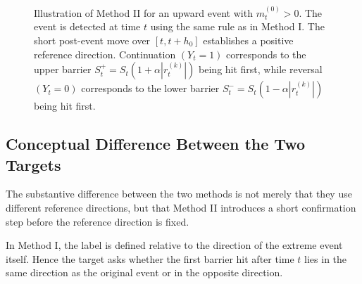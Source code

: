 \documentclass[11pt,a4paper]{article}
\begin{document}
\begin{figure}[H]
		\caption{Illustration of Method II for an upward event with \(m_t^{(0)}>0\). The event is detected at time \(t\) using the same rule as in Method I. The short post-event move over \([t,t+h_0]\) establishes a positive reference direction. Continuation \((Y_t=1)\) corresponds to the upper barrier \(S_t^{+}=S_t(1+\alpha |r_t^{(k)}|)\) being hit first, while reversal \((Y_t=0)\) corresponds to the lower barrier \(S_t^{-}=S_t(1-\alpha |r_t^{(k)}|)\) being hit first.}
		\label{fig:method2_positive_post_sign}
	\end{figure}
	
	\subsection{Conceptual Difference Between the Two Targets}

	The substantive difference between the two methods is not merely that they use different reference directions, but that Method II introduces a short confirmation step before the reference direction is fixed.

	In Method I, the label is defined relative to the direction of the extreme event itself. Hence the target asks whether the first barrier hit after time \(t\) lies in the same direction as the original event or in the opposite direction.
\end{document}
